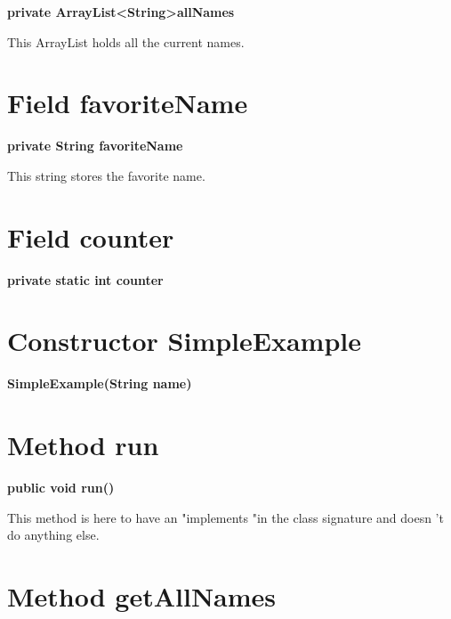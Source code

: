 \documentclass[12pt]{scrreprt}
\begin{document}
\textbf{private ArrayList\textless String\textgreater  allNames}


This ArrayList holds all the current names.



\section{Field favoriteName}
\label{examples.SimpleExample:favoriteName}




\textbf{private String favoriteName}


This string stores the favorite name.



\section{Field counter}
\label{examples.SimpleExample:counter}




\textbf{private static int counter}






\section{Constructor SimpleExample}
\label{examples.SimpleExample:SimpleExample}




\textbf{SimpleExample(String name)}








\section{Method run}
\label{examples.SimpleExample:run}




\textbf{public void run()}


This method is here to have an "implements "in the class signature and doesn 't do anything else.





\section{Method getAllNames}
\label{examples.SimpleExample:getAllNames}
\end{document}
